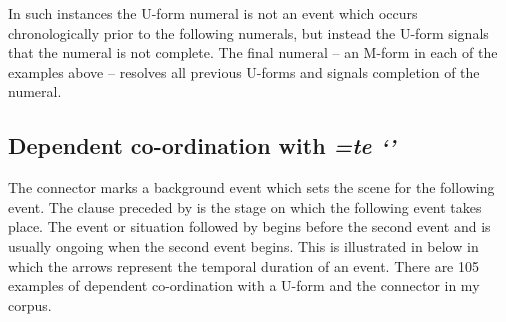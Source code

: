 \begin{exe}
	\label{ex:83}
	\label{ex:130823-5, 0.42}
\end{exe}

In such instances the U-form numeral is not an event which
occurs chronologically prior to the following numerals,
but instead the U-form signals that the numeral is not complete.
The final numeral -- an M-form in each of the examples above --
resolves all previous U-forms and signals completion of the numeral.

\subsection{Dependent co-ordination with \it{=te} `'}\label{sec:Coo=Te}
The connector  marks a background event
which sets the scene for the following event.
The clause preceded by  is the stage
on which the following event takes place.
The event or situation followed by  begins before the second event
and is usually ongoing when the second event begins.
This is illustrated in  below
in which the arrows represent the temporal duration of an event.
There are 105 examples of dependent co-ordination with
a U-form and the connector  in my corpus.

